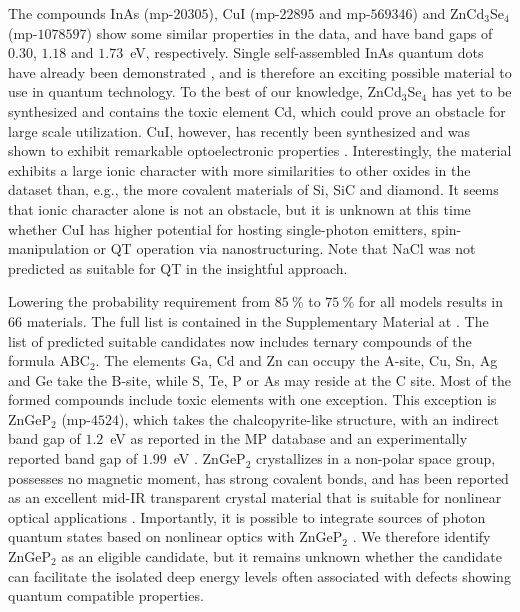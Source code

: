 \documentclass[superscriptaddress,unsortedaddress,
 amsmath,amssymb,
 aps,
]{revtex4-2}
\begin{document}
The compounds InAs (mp-$20305$), CuI (mp-$22895$ and mp-$569346$) and ZnCd$_3$Se$_4$ (mp-$1078597$) show some similar properties in the data, and have band gaps of $0.30$, $1.18$ and $1.73$~eV, respectively. Single self-assembled InAs quantum dots have already been demonstrated \cite{Liu2018}, and is therefore an exciting possible material to use in quantum technology. To the best of our knowledge, ZnCd$_3$Se$_4$ has yet to be synthesized and contains the toxic element Cd, which could prove an obstacle for large scale utilization. CuI, however, has recently been synthesized and was shown to exhibit remarkable optoelectronic properties \cite{Ahn2020}. Interestingly, the material exhibits a large ionic character with more similarities to other oxides in the dataset than, e.g., the more covalent materials of Si, SiC and diamond.  
It seems that ionic character alone is not an obstacle, but it is unknown at this time whether CuI has higher potential for hosting single-photon emitters, spin-manipulation or QT operation via nanostructuring. 
Note that NaCl was not predicted as suitable for QT in the insightful approach. 

Lowering the probability requirement from $85 \ \%$ to $75 \ \%$ for all models results in $66$ materials. 
The full list is contained in the Supplementary Material at \cite{supplementary}. 
The list of predicted suitable candidates now includes ternary compounds of the formula ABC$_2$. The elements Ga, Cd and Zn can occupy the A-site, Cu, Sn, Ag and Ge take the B-site, while S, Te, P or As may reside at the C site. Most of the formed compounds include toxic elements with one exception. This exception is ZnGeP$_2$ (mp-$4524$), which takes the chalcopyrite-like structure, with an indirect band gap of $1.2$~eV \cite{Zhang2015} as reported in the MP database and an experimentally reported band gap of $1.99$~eV \cite{Xing1989}.
ZnGeP$_2$ crystallizes in a non-polar space group, possesses no magnetic moment, has strong covalent bonds, and has been reported as an excellent mid-IR transparent crystal material that is suitable for nonlinear optical applications \cite{Zhang2015}. Importantly, it is possible to integrate sources of photon quantum states based on nonlinear optics with ZnGeP$_2$ \cite{Caspani2017}. 
We therefore identify ZnGeP$_2$ as an eligible candidate, but it remains unknown  
whether the candidate can facilitate the isolated deep energy levels often associated with defects showing quantum compatible properties. 
\end{document}
